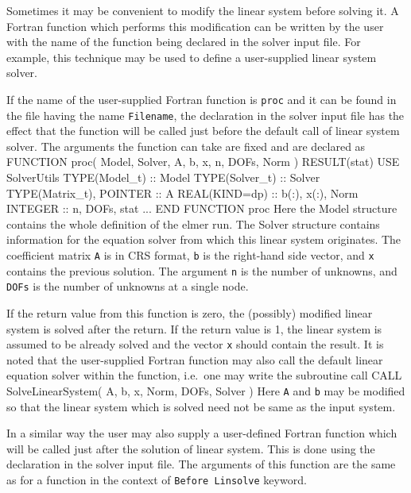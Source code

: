 \begin{versiona}
Sometimes it may be convenient to modify the linear system 
before solving it. A Fortran function which performs this modification can be
written by the user with the name of the function being declared in the solver 
input file. For example, this technique may be used to define a user-supplied 
linear system solver. 

If the name of the user-supplied Fortran function is {\tt proc} and it 
can be found in the file having the name {\tt Filename}, the declaration
\sifbegin
{}
\sifend
in the solver input file has the effect that the function will be called just
before the default call of linear system solver.
The arguments the function can take are fixed and are declared as  
\ttbegin
   FUNCTION proc( Model, Solver, A,  b, x, n, DOFs, Norm ) RESULT(stat)
      USE SolverUtils
      TYPE(Model_t)  :: Model
      TYPE(Solver_t) :: Solver
      TYPE(Matrix_t), POINTER :: A
      REAL(KIND=dp) :: b(:), x(:), Norm
      INTEGER :: n, DOFs, stat 
      ...
   END FUNCTION proc
\ttend
Here the Model structure contains the whole definition of the elmer run. The Solver structure
contains information for the equation solver from which this linear system originates. 
The coefficient matrix {\tt A} is in CRS format, {\tt b} is the right-hand side vector, 
and {\tt x} contains the previous solution. The argument {\tt n} is the number of 
unknowns, and {\tt DOFs} is the number of unknowns at a single node. 

If the return value from this function is zero, the (possibly) modified linear system is solved
after the return. If the return value is 1, the linear system is assumed to be already solved
and the vector {\tt x} should contain the result. It is noted that the user-supplied Fortran function  
may also call the default linear equation solver within the function, i.e.\ one may write
the subroutine call
\ttbegin
   CALL SolveLinearSystem( A, b, x, Norm, DOFs, Solver )
\ttend
Here {\tt A} and {\tt b} may be modified so that the linear system which is solved need not be 
same as the input system.

In a similar way the user may also supply a user-defined Fortran function which
will be called just after the solution of linear system. This is done using the 
declaration
\sifbegin
{}
\sifend
in the solver input file. The arguments of this function are the same as for a  
function in the context of {\tt Before Linsolve} keyword.




\end{versiona}
